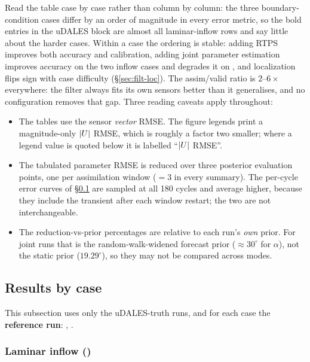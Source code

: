 Read the table case by case rather than column by column: the three
boundary-condition cases differ by an order of magnitude in every error metric,
so the bold entries in the uDALES block are almost all laminar-inflow rows and
say little about the harder cases. Within a case the ordering is stable: adding
RTPS improves both accuracy and calibration, adding joint parameter estimation
improves accuracy on the two inflow cases and degrades it on ,
and localization flips sign with case difficulty (\S\ref{sec:filt-loc}). The
assim/valid ratio is $2$--$6\times$ everywhere: the filter always fits its own
sensors better than it generalises, and no configuration removes that gap. Three
reading caveats apply throughout:
\begin{itemize}[nosep]
  \item The tables use the sensor \emph{vector} RMSE. The figure legends print
        a magnitude-only $|U|$ RMSE, which is roughly a factor two smaller;
        where a legend value is quoted below it is labelled ``$|U|$ RMSE''.
  \item The tabulated parameter RMSE is reduced over three posterior evaluation
        points, one per assimilation window ($=3$ in every
        summary). The per-cycle error curves of \S\ref{sec:filt-cases} are
        sampled at all 180 cycles and average higher, because they include the
        transient after each window restart; the two are not interchangeable.
  \item The reduction-vs-prior percentages are relative to each run's
        \emph{own} prior. For joint runs that is the random-walk-widened
        forecast prior ($\approx 30^\circ$ for $\alpha$), not the static prior
        ($19.29^\circ$), so they may not be compared across modes.
\end{itemize}

\subsection{Results by case}
\label{sec:filt-cases}

This subsection uses only the uDALES-truth runs, and for each case the
\textbf{reference run}: , .

\subsubsection{Laminar inflow ()}
\label{sec:filt-case-inflow}


